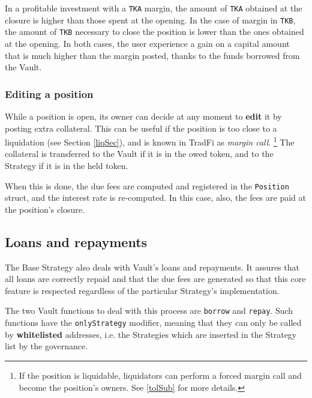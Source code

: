 \documentclass[a4paper,10 pt]{article}
\theoremstyle{definition}
\begin{document}
In a profitable investment with a \verb|TKA| margin, the amount of \verb|TKA| obtained at the closure is higher than those spent at the opening. In the case of margin in \verb|TKB|, the amount of \verb|TKB| necessary to close the position is lower than the ones obtained at the opening. In both cases, the user experience a gain on a capital amount that is much higher than the margin posted, thanks to the funds borrowed from the Vault.

\subsubsection{Editing a position}\label{editSubSub}

While a position is open, its owner can decide at any moment to {\bf edit} it by posting extra collateral. This can be useful if the position is too close to a liquidation (see Section \ref{liqSec}), and is known in TradFi as {\it margin call}. \footnote{If the position is liquidable, liquidators can perform a forced margin call and become the position's owners. See \ref{tolSub} for more details.} The collateral is transferred to the Vault if it is in the owed token, and to the Strategy if it is in the held token.

When this is done, the due fees are computed and registered in the \verb|Position| struct, and the interest rate is re-computed. In this case, also, the fees are paid at the position's closure.

\subsection{Loans and repayments}\label{lrSub}

The Base Strategy also deals with Vault's loans and repayments. It assures that all loans are correctly repaid and that the due fees are generated so that this core feature is respected regardless of the particular Strategy's implementation.

The two Vault functions to deal with this process are \verb|borrow| and \verb|repay|. Such functions have the \verb|onlyStrategy| modifier, meaning that they can only be called by {\bf whitelisted} addresses, i.e. the Strategies which are inserted in the Strategy list by the governance.
\end{document}
